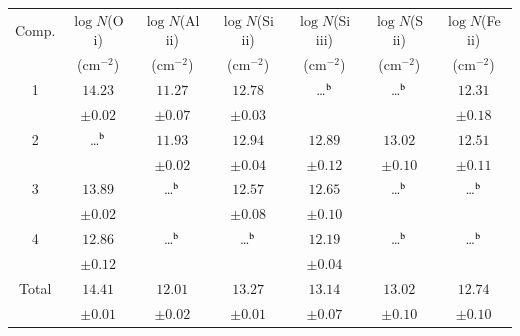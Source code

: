 \documentclass[12pt,preprint,useAMS,usenatbib]{emulateapj}
\begin{document}
\begin{table}
\begin{minipage}[c]{0.6\textwidth}
    \smallskip\smallskip\smallskip

    \begin{tabular}{@{}ccccccc}
    \hline
   \multicolumn{1}{c}{Comp.}
& \multicolumn{1}{c}{$\log N$\/(O\,{\sc i})}
& \multicolumn{1}{c}{$\log N$\/(Al\,{\sc ii})}
& \multicolumn{1}{c}{$\log N$\/(Si\,{\sc ii})}
& \multicolumn{1}{c}{$\log N$\/(Si\,{\sc iii})}
& \multicolumn{1}{c}{$\log N$\/(S\,{\sc ii})}
& \multicolumn{1}{c}{$\log N$\/(Fe\,{\sc ii})}\\
    \multicolumn{1}{c}{}
& \multicolumn{1}{c}{(cm$^{-2}$)}
& \multicolumn{1}{c}{(cm$^{-2}$)}
& \multicolumn{1}{c}{(cm$^{-2}$)}
& \multicolumn{1}{c}{(cm$^{-2}$)}
& \multicolumn{1}{c}{(cm$^{-2}$)}
& \multicolumn{1}{c}{(cm$^{-2}$)}\\
  \hline
1  & $14.23$              & $11.27$               & $12.78$              &  \ldots$^{\rm b}$   &  \ldots$^{\rm b}$   & $12.31$ \\
    & $\pm 0.02$             & $\pm 0.07$            & $\pm 0.03$            &                                &                               & $\pm 0.18$ \\
2  & \ldots$^{\rm b}$   & $11.93$               & $12.94$               &  $12.89$               & $13.02$               & $12.51$ \\
    &                                & $\pm0.02$             &  $\pm0.04$             &  $\pm0.12$            &  $\pm0.10$            &  $\pm0.11$  \\
3  & $13.89$               & \ldots$^{\rm b}$   & $12.57$                &  $12.65$             & \ldots$^{\rm b}$  & \ldots$^{\rm b}$ \\
    & $\pm 0.02$          &                                & $\pm0.08$               &  $\pm0.10$          &      &   \\
4  & $12.86$               & \ldots$^{\rm b}$   & \ldots$^{\rm b}$   &  $12.19$            & \ldots$^{\rm b}$  & \ldots$^{\rm b}$ \\
    & $\pm 0.12$         &                                &                                 &  $\pm0.04$         &       &   \\
Total  & $14.41$         & $12.01$             & $13.27$                &  $13.14$      & $13.02$  & $12.74$ \\
    &     $\pm0.01$        &    $\pm0.02$      & $\pm0.01$            &  $\pm0.07$  & $\pm0.10$  & $\pm0.10$  \\
  \hline
    \end{tabular}


\end{minipage}
\end{table}
\end{document}
